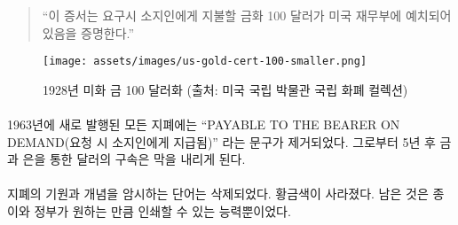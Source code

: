 \begin{comment}
	\begin{quotation}\begin{samepage}
			\enquote{This certifies that there have been deposited in the treasury of the
				United States of America one hundred dollars in gold coin payable to
				the bearer on demand.}
	\end{samepage}\end{quotation}
\end{comment}
\begin{quotation}\begin{samepage}
		\enquote{이 증서는 요구시 소지인에게 지불할 금화 100 달러가 미국 재무부에 예치되어 있음을 증명한다.}
\end{samepage}\end{quotation}

\begin{comment}
	\begin{figure}
		\centering
		\texttt{[image: assets/images/us-gold-cert-100-smaller.png]}
		\caption{A 1928 U.S. \$100 gold certificate. Picture cc-by-sa National Numismatic Collection, National Museum of American History.}
		\label{fig:us-gold-cert-100-smaller}
	\end{figure}
\end{comment}
\begin{figure}
	\centering
	\texttt{[image: assets/images/us-gold-cert-100-smaller.png]}
	\caption{1928년 미화 금 100 달러화 (출처: 미국 국립 박물관 국립 화폐 컬렉션)}
	\label{fig:us-gold-cert-100-smaller}
\end{figure}

\paragraph{}
\begin{comment}
	In 1963, the words \enquote{PAYABLE TO THE BEARER ON DEMAND} were removed from
	all newly issued notes. Five years later, the redemption of paper notes
	for gold and silver ended.
\end{comment}
1963년에 새로 발행된 모든 지폐에는 
\enquote{PAYABLE TO THE BEARER ON DEMAND(요청 시 소지인에게 지급됨)} 라는 문구가 제거되었다. 
그로부터 5년 후 금과 은을 통한 달러의 구속은 막을 내리게 된다.

\paragraph{}
\begin{comment}
	The words hinting on the origins and the idea behind paper money were
	removed. The golden color disappeared. All that was left was the paper
	and with it the ability of the government to print as much of it as it
	wishes.
\end{comment}
지폐의 기원과 개념을 암시하는 단어는 삭제되었다. 황금색이 사라졌다. 
남은 것은 종이와 정부가 원하는 만큼 인쇄할 수 있는 능력뿐이었다.

